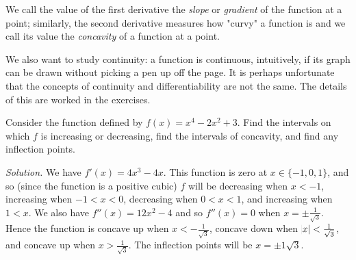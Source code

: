We call the value of the first derivative the \textit{slope} or \textit{gradient} of the function at a point; similarly,
the second derivative measures how "curvy" a function is and we call its value the \textit{concavity} of a function
at a point.

We also want to study continuity: a function is continuous, intuitively, if its graph can be drawn without picking a pen up off
the page. It is perhaps unfortunate that the concepts of continuity and differentiability are not the same. The details of this
are worked in the exercises.

\begin{ex}
  Consider the function defined by $ f(x) = x^4 - 2x^2 + 3 $. Find the intervals on which $ f $
  is increasing or decreasing, find the intervals of concavity, and find any inflection points.

  \textit{Solution.} We have $ f'(x) = 4x^3 - 4x $. This function is zero at $ x \in \{-1, 0, 1\} $, and so (since the function
  is a positive cubic) $ f $ will be decreasing when $ x < -1 $, increasing when $ -1 < x < 0 $, decreasing when $ 0 < x < 1 $,
  and increasing when $ 1 < x $. We also have $ f''(x) = 12x^2 - 4 $ and so $ f''(x) = 0 $ when $ x = \pm \frac{1}{\sqrt{3}} $.
  Hence the function is concave up when $ x < -\frac{1}{\sqrt{3}} $, concave down when $ \abs{x} < \frac{1}{\sqrt{3}} $, and concave
  up when $ x > \frac{1}{\sqrt{3}} $. The inflection points will be $ x = \pm{1}{\sqrt{3}} $.
  \begin{center}
  \end{center}
\end{ex}

\clearpage
